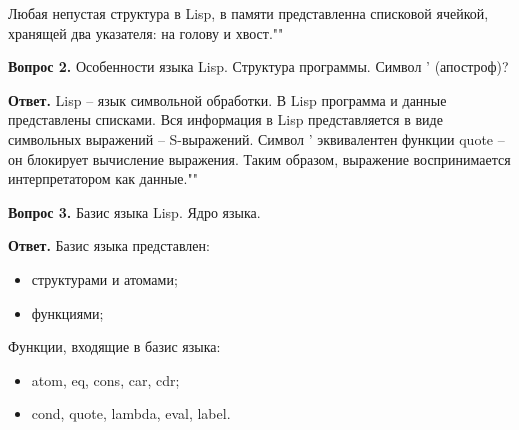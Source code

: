 \documentclass[12pt]{report}
\begin{document}
	Любая непустая структура в Lisp, в памяти представленна списковой ячейкой, хранящей два указателя: на голову и хвост.""\newline
	
	\textbf{Вопрос 2.} Особенности языка Lisp. Структура программы. Символ ’ (апостроф)?
	
	\textbf{Ответ.} Lisp -- язык символьной обработки. В Lisp программа и данные представлены списками. Вся информация в Lisp представляется в виде символьных выражений -- S-выражений. Символ ’ эквивалентен функции quote – он блокирует вычисление выражения. Таким образом, выражение воспринимается интерпретатором как данные.""\newline
	
	\textbf{Вопрос 3.} Базис языка Lisp. Ядро языка. 
	
	\textbf{Ответ.} Базис языка представлен:
	\begin{itemize}
		\item структурами и атомами;
		\item функциями;
	\end{itemize}
	
	Функции, входящие в базис языка:
	\begin{itemize}
		\item atom, eq, cons, car, cdr;
		\item cond, quote, lambda, eval, label.
	\end{itemize}
	
	
	
\end{document}
